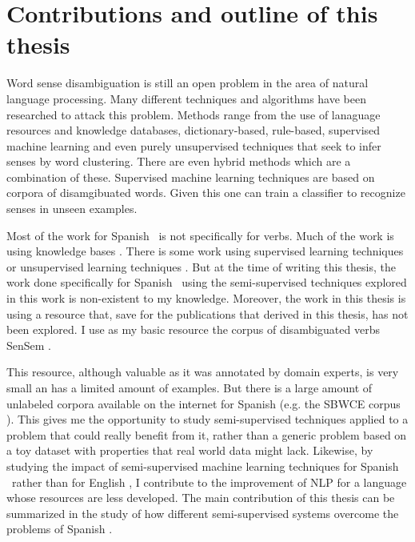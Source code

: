 \section{Contributions and outline of this thesis}\label{section:outline}

Word sense disambiguation is still an open problem in the area of natural
language processing. Many different techniques and algorithms have been
researched to attack this problem. Methods range from the use of lanaguage
resources and knowledge databases, dictionary-based, rule-based, supervised
machine learning and even purely unsupervised techniques that seek to infer
senses by word clustering. There are even hybrid methods which are a
combination of these. Supervised machine learning techniques are based on
corpora of disamgibuated words. Given this one can train a classifier to
recognize senses in unseen examples.

Most of the work for Spanish \wsd~is not specifically for verbs. Much of the
work is using knowledge bases
\cite{Agirre:2014:RWK:2645242.2645245,Agirre:2009:PPW:1609067.1609070}. There
is some work using supervised learning techniques or unsupervised learning
techniques \cite{MihalceaEtAl2004}. But at the time of writing this thesis, the
work done specifically for Spanish \vsd~using the semi-supervised techniques
explored in this work is non-existent to my knowledge. Moreover, the work in
this thesis is using a resource that, save for the publications that derived in
this thesis, has not been explored. I use as my basic resource the corpus of
disambiguated verbs SenSem \cite{alonso-etal-07-sensem}.

This resource, although valuable as it was annotated by domain experts, is very
small an has a limited amount of examples. But there is a large amount of
unlabeled corpora available on the internet for Spanish (e.g. the SBWCE corpus
\cite{cardellinoSBWCE}). This gives me the opportunity to study semi-supervised
techniques applied to a problem that could really benefit from it, rather than
a generic problem based on a toy dataset with properties that real world data
might lack. Likewise, by studying the impact of semi-supervised machine
learning techniques for Spanish \vsd~rather than for English \vsd, I contribute
to the improvement of NLP for a language whose resources are less developed.
The main contribution of this thesis can be summarized in the study of how
different semi-supervised systems overcome the problems of Spanish \vsd.

